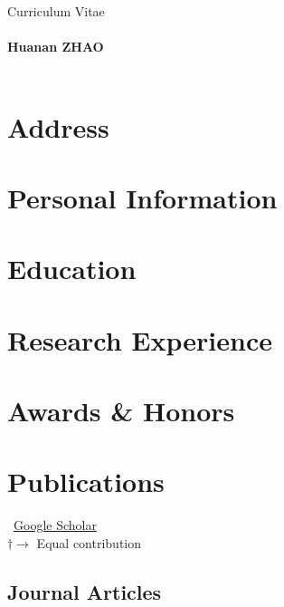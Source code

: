 \documentclass[11pt]{article} %
\newcommand{\mytitle}[1]{
  \begin{center}
    Curriculum Vitae\\
    \hspace{4pt} \\ %
    \Large\textbf{#1}\normalsize \\
    \hspace{4pt} \\ %
  \end{center}
}
\begin{document}
\mytitle{Huanan ZHAO}
\RaggedRight



\section*{Address}


\section*{Personal Information}


\section*{Education}


\section*{Research Experience}
\label{exp_research}


\section*{Awards \& Honors}
\label{awards}



\section*{Publications}
\label{pubs}

\vspace{-.75em}
\small
\faGoogle~\href{https://scholar.google.com/}{Google Scholar}\\
$\dagger \rightarrow$ Equal contribution
\normalsize


\subsection*{Journal Articles}
\label{journal-article}
\newrefcontext[labelprefix=J] %
\nocite{*} %
\printbibliography[
    type=article, %
    heading=none, %
    resetnumbers=true, %
    keyword=J %
]
\end{document}
